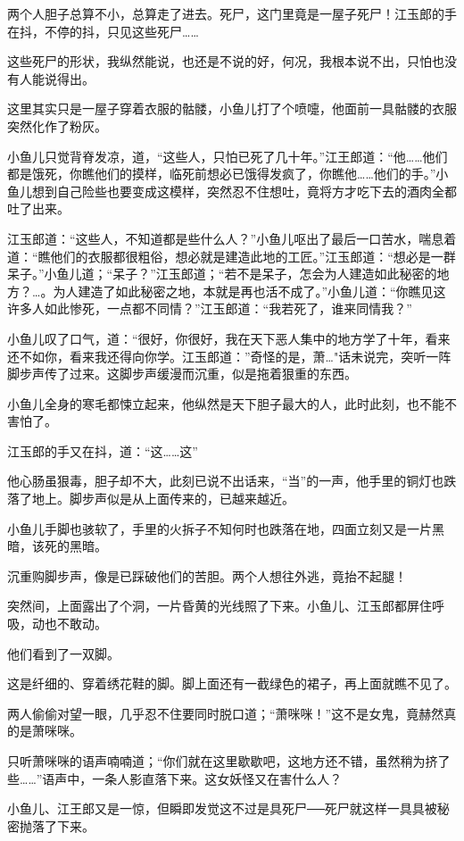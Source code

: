 \documentclass[12pt,oneside]{book}
\begin{document}
两个人胆子总算不小，总算走了进去。死尸，这门里竟是一屋子死尸！江玉郎的手在抖，不停的抖，只见这些死尸\ldots\ldots{}

这些死尸的形状，我纵然能说，也还是不说的好，何况，我根本说不出，只怕也没有人能说得出。

这里其实只是一屋子穿着衣服的骷髅，小鱼儿打了个喷嚏，他面前一具骷髅的衣服突然化作了粉灰。

小鱼儿只觉背脊发凉，道，``这些人，只怕已死了几十年。''江王郎道：``他\ldots\ldots 他们都是饿死，你瞧他们的摸样，临死前想必已饿得发疯了，你瞧他\ldots\ldots 他们的手。''小鱼儿想到自己险些也要变成这模样，突然忍不住想吐，竟将方才吃下去的酒肉全都吐了出来。

江玉郎道：``这些人，不知道都是些什么人？''小鱼儿呕出了最后一口苦水，喘息着道：``瞧他们的衣服都很粗俗，想必就是建造此地的工匠。''江玉郎道：``想必是一群呆子。''小鱼儿道；``呆子？''江玉郎道；``若不是呆子，怎会为人建造如此秘密的地方？\ldots。为人建造了如此秘密之地，本就是再也活不成了。''小鱼儿道：``你瞧见这许多人如此惨死，一点都不同情？''江玉郎道：``我若死了，谁来同情我？''

小鱼儿叹了口气，道：``很好，你很好，我在天下恶人集中的地方学了十年，看来还不如你，看来我还得向你学。江玉郎道：''奇怪的是，萧\ldots"话未说完，突听一阵脚步声传了过来。这脚步声缓漫而沉重，似是拖着狠重的东西。

小鱼儿全身的寒毛都悚立起来，他纵然是天下胆子最大的人，此时此刻，也不能不害怕了。

江玉郎的手又在抖，道：``这\ldots\ldots 这''

他心肠虽狠毒，胆子却不大，此刻已说不出话来，``当''的一声，他手里的铜灯也跌落了地上。脚步声似是从上面传来的，已越来越近。

小鱼儿手脚也骇软了，手里的火拆子不知何时也跌落在地，四面立刻又是一片黑暗，该死的黑暗。

沉重购脚步声，像是已踩破他们的苦胆。两个人想往外逃，竟抬不起腿！

突然间，上面露出了个洞，一片昏黄的光线照了下来。小鱼儿、江玉郎都屏住呼吸，动也不敢动。

他们看到了一双脚。

这是纤细的、穿着绣花鞋的脚。脚上面还有一截绿色的裙子，再上面就瞧不见了。

两人偷偷对望一眼，几乎忍不住要同时脱口道；``萧咪咪！''这不是女鬼，竟赫然真的是萧咪咪。

只听萧咪咪的语声喃喃道；``你们就在这里歇歇吧，这地方还不错，虽然稍为挤了些\ldots\ldots{}''语声中，一条人影直落下来。这女妖怪又在害什么人？

小鱼儿、江王郎又是一惊，但瞬即发觉这不过是具死尸──死尸就这样一具具被秘密抛落了下来。
\end{document}
